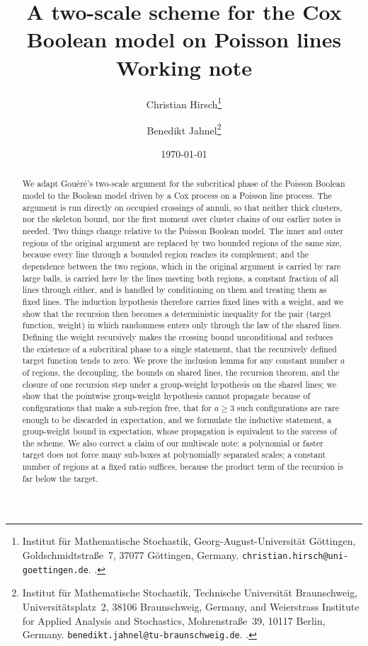 \documentclass[11pt,letterpaper]{article}
\title{\textbf{A two-scale scheme for the Cox Boolean model on Poisson lines}\\[0.6em] \large Working note}
\author{%
  Christian Hirsch\thanks{Institut f\"ur Mathematische Stochastik, Georg-August-Universit\"at G\"ottingen, Goldschmidtstra\ss e~7, 37077 G\"ottingen, Germany. \texttt{christian.hirsch@uni-goettingen.de}. \orcid{0000-0003-4136-3740}.}
  \and
  Benedikt Jahnel\thanks{Institut f\"ur Mathematische Stochastik, Technische Universit\"at Braunschweig, Universit\"atsplatz~2, 38106 Braunschweig, Germany, and Weierstrass Institute for Applied Analysis and Stochastics, Mohrenstra\ss e~39, 10117 Berlin, Germany. \texttt{benedikt.jahnel@tu-braunschweig.de}. \orcid{0000-0002-4212-0065}.}%
}
\date{\today}
\begin{document}
\maketitle
\thispagestyle{plain}

\begin{abstract}
We adapt Gou\'er\'e's two-scale argument for the subcritical phase of the Poisson Boolean model to the Boolean model driven by a Cox process on a Poisson line process. The argument is run directly on occupied crossings of annuli, so that neither thick clusters, nor the skeleton bound, nor the first moment over cluster chains of our earlier notes is needed. Two things change relative to the Poisson Boolean model. The inner and outer regions of the original argument are replaced by two bounded regions of the same size, because every line through a bounded region reaches its complement; and the dependence between the two regions, which in the original argument is carried by rare large balls, is carried here by the lines meeting both regions, a constant fraction of all lines through either, and is handled by conditioning on them and treating them as fixed lines. The induction hypothesis therefore carries fixed lines with a weight, and we show that the recursion then becomes a deterministic inequality for the pair (target function, weight) in which randomness enters only through the law of the shared lines. Defining the weight recursively makes the crossing bound unconditional and reduces the existence of a subcritical phase to a single statement, that the recursively defined target function tends to zero. We prove the inclusion lemma for any constant number $a$ of regions, the decoupling, the bounds on shared lines, the recursion theorem, and the closure of one recursion step under a group-weight hypothesis on the shared lines; we show that the pointwise group-weight hypothesis cannot propagate because of configurations that make a sub-region free, that for $a\ge3$ such configurations are rare enough to be discarded in expectation, and we formulate the inductive statement, a group-weight bound in expectation, whose propagation is equivalent to the success of the scheme. We also correct a claim of our multiscale note: a polynomial or faster target does not force many sub-boxes at polynomially separated scales; a constant number of regions at a fixed ratio suffices, because the product term of the recursion is far below the target.
\end{abstract}

\end{document}
